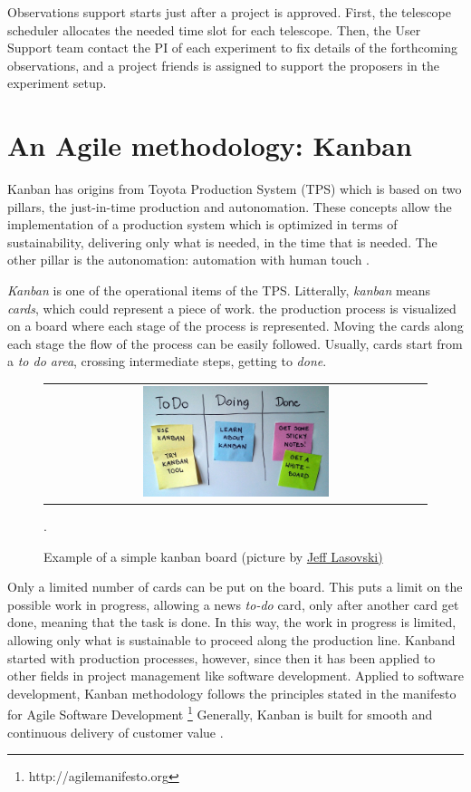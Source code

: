 \documentclass[a4paper]{spie}  %
\begin{document}
Observations support starts just after a project is approved. First,  the telescope scheduler allocates the needed time slot for each telescope. Then, the User Support team contact the PI of each experiment to fix details of the forthcoming observations, and a project friends is assigned to support the proposers in the experiment setup. 

\section{An Agile methodology: Kanban }
Kanban has origins from Toyota Production System (TPS) which is based on two pillars, the just-in-time production and autonomation. 
These  concepts allow the implementation of a production system which is optimized in terms of sustainability, delivering only what is needed, 
in the time that is needed.
The other pillar is  the autonomation:  automation with human touch \cite{tps}. 

\textit{Kanban} is one of the operational items of the TPS. Litterally, {\it kanban} means {\it cards}, which could represent  a piece of work. the production process is visualized  on a board where each stage of the process is represented. Moving the cards along each stage the flow of the process can be easily followed. 
Usually, cards start from a {\it to do area}, crossing intermediate steps, getting to  {\it done}.
\begin{figure} [ht]
   \begin{center}
   \begin{tabular}{c} 
   \includegraphics[width=0.5\textwidth]{1200px-Simple-kanban-board-.jpg}
	\end{tabular}
	\end{center}
   \caption[example] 
   { \label{fig:kanban} Example of a simple kanban board (picture  by  \href{https://commons.wikimedia.org/wiki/File:Simple-kanban-board-.jpg}{Jeff Lasovski)}
 }.
   \end{figure} 
 Only a limited number of cards can be put on the board. This puts a limit on the possible work in progress, allowing a news {\it to-do} card, only
 after another card get {done}, meaning that the task is done. In this way, the work in progress is limited, allowing only what is sustainable to proceed along the production line.
 Kanband  started with production processes, however, since then it has been applied to other fields in project management  like software development\cite{brech15}. 
Applied to software development, Kanban methodology follows the principles stated in the manifesto for Agile Software Development
\footnote{http://agilemanifesto.org}   Generally,  Kanban is built for smooth and continuous delivery of customer value \cite{brech15}.
\end{document}
